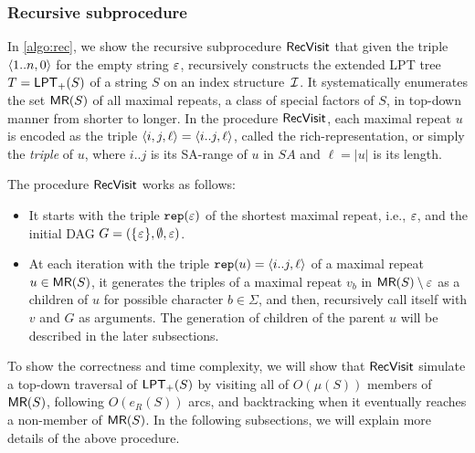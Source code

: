 \documentclass{article}
\begin{document}
\subsubsection{Recursive subprocedure}
In \cref{algo:rec}, we show the recursive subprocedure $\Rec$ that given the triple $\pair{1..n, 0}$ for the empty string $\eps$, recursively constructs the extended LPT tree $T = \LPT[+](S)$ of a string $S$ on an index structure~$\sig I$. It systematically enumerates the set $\MR(S)$ of all maximal repeats, a class of special factors of $S$, in top-down manner from shorter to longer. In the procedure $\Rec$, each maximal repeat $u$ is encoded as the triple $\pair{i, j, \ell} = \pair{i..j, \ell}$, called the rich-representation, or simply the \textit{triple} of $u$, where $i..j$ is its SA-range of $u$ in $SA$ and $\ell = |u|$ is its length.

The procedure $\Rec$ works as follows: 
\begin{itemize}
\item It starts with the triple $\op{rep}(\eps)$ of the shortest maximal repeat, i.e., $\eps$, and the initial DAG $G = (\set{\eps}, \emptyset{}, \eps)$. 
  
\item At each iteration with the triple $\op{rep}(u) = \pair{i..j, \ell}$ of a maximal repeat $u \in \MR(S)$, it generates the triples of a maximal repeat $v_b$ in $\MR(S)\setminus{\eps}$ as a children of $u$ for possible character $b\in\Sigma$, and then, recursively call itself with $v$ and $G$ as arguments. The generation of children of the parent $u$ will be described in the later subsections. 
\end{itemize}

To show the correctness and time complexity, we will show that $\Rec$ simulate a top-down traversal of $\LPT[+](S)$ by visiting all of $O(\mu(S))$ members of $\MR(S)$, following $O(e_R(S))$ arcs, and backtracking when it eventually reaches a non-member of $\MR(S)$.
In the following subsections, we will explain more details of the above procedure. 

\end{document}
